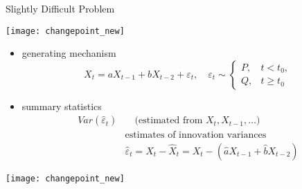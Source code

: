\documentclass[fleqn,aspectratio=1610]{beamer}
\begin{document}
\begin{frame}[label={sec:org93c3ced},t]{Slightly Difficult Problem}
\begin{center}
\texttt{[image: changepoint\_new]}
\end{center}
\begin{overprint}
\begin{itemize}
\item generating mechanism
\begin{equation}
  X_{t}=
  aX_{t-1}+bX_{t-2}+\varepsilon_{t},
  \quad\varepsilon_{t}\sim 
  \begin{cases}
    P,&t<t_{0}, \\
    Q,&t\geq t_{0}
  \end{cases}
\end{equation}
\end{itemize}
\begin{itemize}
\item summary statistics
\begin{align}
  Var(\hat{\varepsilon}_{t})
  &\quad
    \text{(estimated from \(X_{t},X_{t-1},\dotsc\))}\\
  &\text{estimates of innovation variances}\\
  &\hat{\varepsilon}_{t}=X_{t}-\hat{X}_{t}=X_{t}-(\hat{a}X_{t-1}+\hat{b}X_{t-2})
\end{align}
\end{itemize}
\begin{center}
\texttt{[image: changepoint\_new]}
\end{center}
\end{overprint}
\end{frame}
\end{document}

